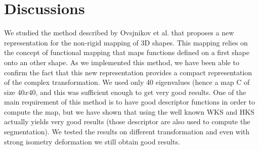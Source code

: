 \documentclass[10pt,twocolumn,letterpaper]{article}
\begin{document}
\section{Discussions} %
We studied the method described by Ovsjnikov et al. that proposes a new representation for the non-rigid mapping of 3D shapes. This mapping relies on the concept of functional mapping that maps functions defined on a first shape onto an other shape. As we implemented this method, we have been able to confirm the fact that this new representation provides a compact representation of the complex transformation. We used only 40 eigenvalues (hence a map C of size $40x40$, and this was sufficient enough to get very good results. One of the main requirement of this method is to have good descriptor functions in order to compute the map, but we have shown that using the well known WKS and HKS actually yields very good results (those descriptor are also used to compute the segmentation). We tested the results on different transformation and even with strong isometry deformation we still obtain good results.


{\small


}
\end{document}

